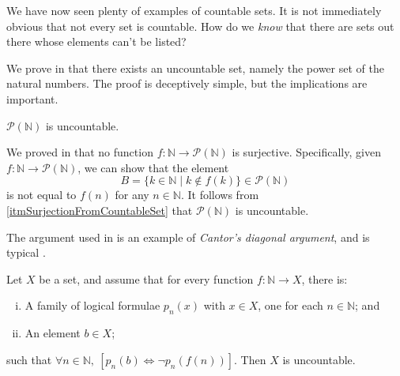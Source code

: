 We have now seen plenty of examples of countable sets. It is not immediately obvious that not every set is countable. How do we \textit{know} that there are sets out there whose elements can't be listed?

We prove in  that there exists an uncountable set, namely the power set of the natural numbers. The proof is deceptively simple, but the implications are important.

\begin{theorem}
\label{thmCantorForN}
$\mathcal{P}(\mathbb{N})$ is uncountable.
\end{theorem}

\begin{cproof}
We proved in  that no function $f : \mathbb{N} \to \mathcal{P}(\mathbb{N})$ is surjective. Specifically, given $f : \mathbb{N} \to \mathcal{P}(\mathbb{N})$, we can show that the element
\[ B = \{ k \in \mathbb{N} \mid k \not\in f(k) \} \in \mathcal{P}(\mathbb{N}) \]
is not equal to $f(n)$ for any $n \in \mathbb{N}$. It follows from \ref{itmSurjectionFromCountableSet} that $\mathcal{P}(\mathbb{N})$ is uncountable.
\end{cproof}

The argument used in  is an example of \textit{Cantor's diagonal argument}, and is typical .

\begin{theorem}
\label{thmCantorDiagonalGeneral}
Let $X$ be a set, and assume that for every function $f : \mathbb{N} \to X$, there is:
\begin{enumerate}[(i)]
\item A family of logical formulae $p_n(x)$ with $x \in X$, one for each $n \in \mathbb{N}$; and
\item An element $b \in X$;
\end{enumerate}
such that $\forall n \in \mathbb{N},~ [p_n(b) \Leftrightarrow \neg p_n(f(n))]$. Then $X$ is uncountable.
\end{theorem}

